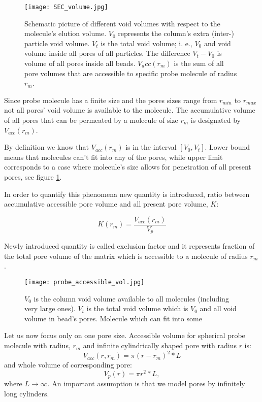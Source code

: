 \begin{figure}[h]
	\centering
    \texttt{[image: SEC\_volume.jpg]}
    \caption{Schematic picture of different void volumes with respect to the
    molecule's elution volume. $V_0$ represents the column's extra (inter-)
    particle void volume. $V_t$ is the total void volume; i. e., $V_0$ and void
    volume inside all pores of all particles. The difference $V_t - V_0$ is
    volume of all pores inside all beads. $V_acc(r_m)$ is the sum of all pore
    volumes that are accessible to specific probe molecule of radius $r_m$.}
	\label{fig:volScale}
\end{figure}

Since probe molecule has a finite size and the pores sizes range from $r_{min}$
to $r_{max}$ not all pores' void volume is available to the molecule. The
accumulative volume of all pores that can be permeated by a molecule of size
$r_m$ is designated by $V_{acc}(r_m)$. 

By definition we know that $V_{acc}(r_m)$ is in the interval $[V_0, V_t]$.
Lower bound means that molecules can't fit into any of the pores, while upper
limit corresponds to a case where molecule's size allows for penetration of all
present pores, see figure \ref{fig:volScale}.

In order to quantify this phenomena new quantity is introduced, ratio between
accumulative accessible pore volume and all present pore volume, $K$:

\begin{equation}\label{eq:exclusion_factor}
    K(r_m) = \frac{V_{acc}(r_m)}{V_p}
\end{equation}

Newly introduced quantity is called exclusion factor and it represents fraction 
of the total pore volume of the matrix which is accessible to a molecule of 
radius $r_m$.

\begin{figure}[h]
	\centering
    \texttt{[image: probe\_accessible\_vol.jpg]}
    \caption{$V_0$ is the column void volume available to all molecules
    (including very large ones). $V_t$ is the total void volume which is $V_0$
    and all void volume in bead's pores. Molecule which can fit into some}
	\label{fig1}
\end{figure}

Let us now focus only on one pore size. Accessible volume for spherical probe 
molecule with radius, $r_m$ and infinite cylindrically shaped pore with radius
$r$ is:
\begin{equation} \label{eq:acc_vol}
    V_{acc}(r, r_m) = \pi (r - r_m )^2 * L
\end{equation}
and whole volume of corresponding pore:
\begin{equation}
    V_{p}(r) = \pi r^2 * L,
\end{equation}
where $L\rightarrow\infty$. An important assumption is that we model pores by 
infinitely long cylinders.


